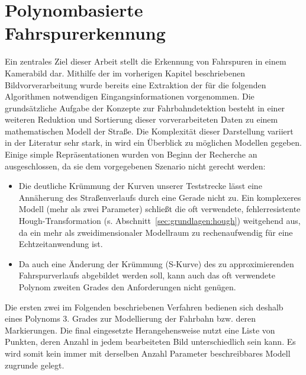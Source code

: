\chapter{Polynombasierte Fahrspurerkennung \dcsecondauthorshort}
\label{cha:fahrspurerkennung}
Ein zentrales Ziel dieser Arbeit stellt die Erkennung von Fahrspuren in einem Kamerabild dar. Mithilfe der im vorherigen Kapitel beschriebenen Bildvorverarbeitung wurde bereits eine Extraktion der für die folgenden Algorithmen notwendigen Eingangsinformationen vorgenommen. Die grundsätzliche Aufgabe der Konzepte zur Fahrbahndetektion besteht in einer weiteren Reduktion und Sortierung dieser vorverarbeiteten Daten zu einem mathematischen Modell der Straße. Die Komplexität dieser Darstellung variiert in der Literatur sehr stark, in \autocite{naroteReviewRecentAdvances2018} wird ein Überblick zu möglichen Modellen gegeben. Einige simple Repräsentationen wurden von Beginn der Recherche an ausgeschlossen, da sie dem vorgegebenen Szenario nicht gerecht werden: 
\begin{itemize}
\item Die deutliche Krümmung der Kurven unserer Teststrecke lässt eine Annäherung des Straßenverlaufs durch eine Gerade nicht zu. Ein komplexeres Modell (mehr als zwei Parameter) schließt die oft verwendete, fehlerresistente Hough-Transformation (s. Abschnitt~\ref{sec:grundlagen:hough}) weitgehend aus, da ein mehr als zweidimensionaler Modellraum zu rechenaufwendig für eine Echtzeitanwendung ist. 
\item Da auch eine Änderung der Krümmung (S-Kurve) des zu approximierenden Fahrspurverlaufs abgebildet werden soll, kann auch das oft verwendete Polynom zweiten Grades den Anforderungen nicht genügen. 
\end{itemize}
Die ersten zwei im Folgenden beschriebenen Verfahren bedienen sich deshalb eines Polynoms 3. Grades zur Modellierung der Fahrbahn bzw. deren Markierungen. Die final eingesetzte Herangehensweise nutzt eine Liste von Punkten, deren Anzahl in jedem bearbeiteten Bild unterschiedlich sein kann. Es wird somit kein immer mit derselben Anzahl Parameter beschreibbares Modell zugrunde gelegt. 

